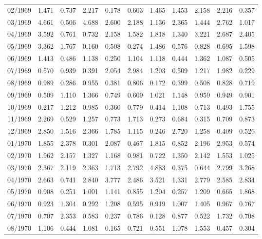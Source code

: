 \begin{tabular}{lrrrrrrrrrr}
02/1969 &  1.471 &  0.737 &  2.217 &  0.178 &  0.603 &  1.465 &  1.453 &  2.158 &  2.216 &  0.357 \\
03/1969 &  4.661 &  0.506 &  4.688 &  2.600 &  2.188 &  1.136 &  2.365 &  1.444 &  2.762 &  1.017 \\
04/1969 &  3.592 &  0.761 &  0.732 &  2.158 &  1.582 &  1.818 &  1.340 &  3.221 &  2.687 &  2.405 \\
05/1969 &  3.362 &  1.767 &  0.160 &  0.508 &  0.274 &  1.486 &  0.576 &  0.828 &  0.695 &  1.598 \\
06/1969 &  1.413 &  0.486 &  1.138 &  0.250 &  1.104 &  1.118 &  0.444 &  1.362 &  1.087 &  0.505 \\
07/1969 &  0.570 &  0.939 &  0.391 &  2.054 &  2.984 &  1.203 &  0.509 &  1.217 &  1.982 &  0.229 \\
08/1969 &  0.989 &  0.286 &  0.955 &  0.381 &  0.806 &  0.172 &  0.399 &  0.508 &  0.828 &  0.719 \\
09/1969 &  0.509 &  1.110 &  1.366 &  0.749 &  0.609 &  1.021 &  1.148 &  0.959 &  0.949 &  0.901 \\
10/1969 &  0.217 &  1.212 &  0.985 &  0.360 &  0.779 &  0.414 &  1.108 &  0.713 &  0.493 &  1.755 \\
11/1969 &  2.269 &  0.529 &  1.257 &  0.773 &  1.713 &  0.273 &  0.684 &  0.315 &  0.709 &  0.873 \\
12/1969 &  2.850 &  1.516 &  2.366 &  1.785 &  1.115 &  0.246 &  2.720 &  1.258 &  0.409 &  0.526 \\
01/1970 &  1.855 &  2.378 &  0.301 &  2.087 &  0.467 &  1.815 &  0.852 &  2.196 &  2.953 &  0.574 \\
02/1970 &  1.962 &  2.157 &  1.327 &  1.168 &  0.981 &  0.722 &  1.350 &  2.142 &  1.553 &  1.025 \\
03/1970 &  2.367 &  2.119 &  2.363 &  1.713 &  2.792 &  4.883 &  0.375 &  0.644 &  2.799 &  3.268 \\
04/1970 &  2.663 &  0.741 &  2.840 &  3.777 &  2.486 &  3.521 &  1.331 &  2.779 &  2.585 &  2.834 \\
05/1970 &  0.908 &  0.251 &  1.001 &  1.141 &  0.855 &  1.204 &  0.257 &  1.209 &  0.665 &  1.868 \\
06/1970 &  0.923 &  1.304 &  0.292 &  1.208 &  0.595 &  0.919 &  1.007 &  1.405 &  0.967 &  0.767 \\
07/1970 &  0.707 &  2.353 &  0.583 &  0.237 &  0.786 &  0.128 &  0.877 &  0.522 &  1.732 &  0.708 \\
08/1970 &  1.106 &  0.444 &  1.081 &  0.165 &  0.721 &  0.551 &  1.078 &  1.553 &  0.457 &  0.304 \\

\end{tabular}
